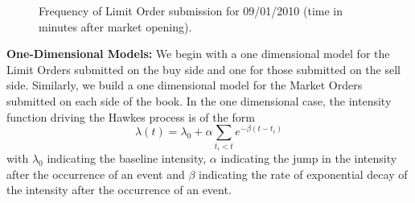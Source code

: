 	\begin{figure}
	\centering
	\caption{Frequency of Limit Order submission for 09/01/2010 (time in minutes after market opening). \label{fig:freqsubmit2}}
	\end{figure}


\noindent\textbf{One-Dimensional Models:} We begin with a one dimensional model for the Limit Orders submitted on the buy side and one for those submitted on the sell side. Similarly, we build a one dimensional model for the Market Orders submitted on each side of the book. In the one dimensional case, the intensity function driving the Hawkes process is of the form
	\begin{equation}\label{eqn:lambda6}
	\lambda(t)= \lambda_0 + \alpha \sum_{t_i<t} e^{-\beta(t-t_i)}
	\end{equation}
with $\lambda_0$ indicating the baseline intensity, $\alpha$ indicating the jump in the intensity after the occurrence of an event and $\beta$ indicating the rate of exponential decay of the intensity after the occurrence of an event.


